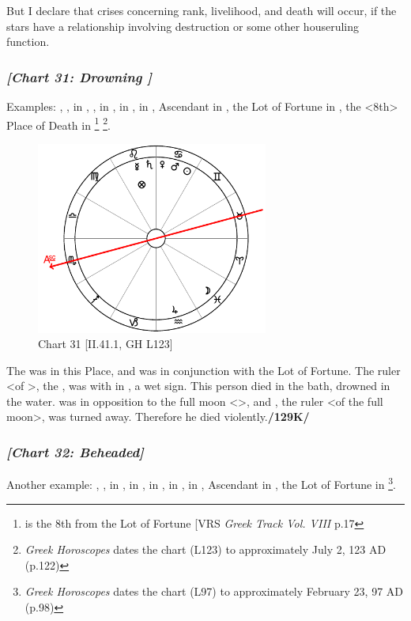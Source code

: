 But I declare that crises concerning rank, livelihood, and death will occur, if the stars have a relationship involving destruction or some other houseruling function.
\newpage
\subsubsection{\textit{[Chart 31: Drowning ]}}
Examples: \Sun, \Mars, \Venus\xspace in \Cancer, \Saturn, \Mercury\xspace in \Leo, \Jupiter\xspace in \Aquarius, \Moon\xspace in \Pisces, Ascendant in \Scorpio, the Lot of Fortune in \Leo, the <8th> Place of Death in \Pisces\footnote{\Pisces\xspace is the 8th from the Lot of Fortune [VRS \textit{Greek Track Vol. VIII} p.17}
\footnote{\textit{Greek Horoscopes} dates the chart (L123) to approximately July 2, 123 AD (p.122)}.

\clearpage
\begin{figure}
\centering
\includegraphics[width=0.68\textwidth]{charts/2_41_1}
\caption{Chart 31 [II.41.1, GH L123]}
\label{fig:chart31}
\end{figure} 

The \Moon\xspace was in this Place, and \Saturn\xspace was in conjunction with the Lot of Fortune. The ruler <of \Leo>, the \Sun, was with \Mars\xspace in \Cancer, a wet sign. This person died in the bath, drowned in the water. \Mars\xspace was in opposition to the full moon <\Capricorn>, and \Saturn, the ruler <of the full moon>, was turned away. Therefore he died violently.\textbf{/129K/}
\newpage
\subsubsection{\textit{[Chart 32: Beheaded]}}
Another example: \Sun, \Mercury, \Venus\xspace in \Pisces, \Saturn\xspace in \Virgo, \Jupiter\xspace in \Aries, \Mars\xspace in \Taurus, \Moon\xspace in \Sagittarius, Ascendant in \Leo, the Lot of Fortune in \Taurus
\footnote{\textit{Greek Horoscopes} dates the chart (L97) to approximately February 23, 97 AD (p.98)}.  


